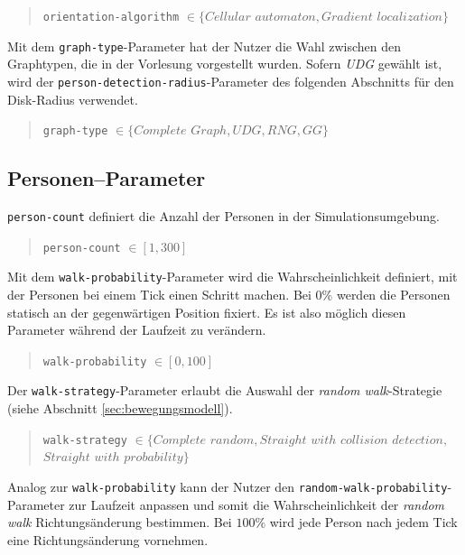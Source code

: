 \begin{quote}
\verb|orientation-algorithm| $\in \{Cellular$ $automaton, Gradient$ $localization\}$
\end{quote}

Mit dem \verb|graph-type|-Parameter hat der Nutzer die Wahl zwischen den Graphtypen, die in der Vorlesung vorgestellt wurden. Sofern \emph{UDG} gewählt ist, wird der \verb|person-detection-radius|-Parameter des folgenden Abschnitts für den Disk-Radius verwendet.

\begin{quote}
\verb|graph-type| $\in \{Complete$ $Graph, UDG, RNG, GG\}$
\end{quote}

\subsection{Personen--Parameter}
\label{sec:gui_person}

\verb|person-count| definiert die Anzahl der Personen in der Simulationsumgebung.

\begin{quote}
\verb|person-count| $\in [1, 300]$
\end{quote}

Mit dem \verb|walk-probability|-Parameter wird die Wahrscheinlichkeit definiert, mit der Personen bei einem Tick einen Schritt machen. Bei $0 \%$ werden die Personen statisch an der gegenwärtigen Position fixiert. Es ist also möglich diesen Parameter während der Laufzeit zu verändern.  

\begin{quote}
\verb|walk-probability| $\in [0, 100]$
\end{quote}

Der \verb|walk-strategy|-Parameter erlaubt die Auswahl der \emph{random walk}-Strategie (siehe Abschnitt \ref{sec:bewegungsmodell}).

\begin{quote}
\verb|walk-strategy| $\in \{Complete$ $random, Straight$ $with$ $collision$ $detection,$\\\hspace*{3.2cm}$Straight$ $with$ $probability\}$
\end{quote}

Analog zur \verb|walk-probability| kann der Nutzer den \verb|random-walk-probability|-Parameter zur Laufzeit anpassen und somit die Wahrscheinlichkeit der \emph{random walk} Richtungsänderung bestimmen. Bei $100 \%$ wird jede Person nach jedem Tick eine Richtungsänderung vornehmen.


